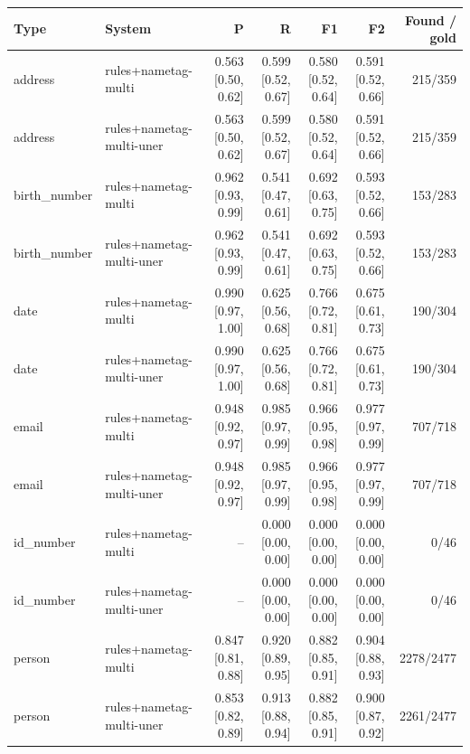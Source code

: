 \providecommand{\ci}[2]{{\scriptsize [#1, #2]}}

\begin{table}[htbp]
\centering
\small
\begin{tabular}{llrrrrr}
\toprule
Type & System & P & R & F1 & F2 & Found / gold \\
\midrule
address & rules+nametag-multi & 0.563 \ci{0.50}{0.62} & 0.599 \ci{0.52}{0.67} & 0.580 \ci{0.52}{0.64} & 0.591 \ci{0.52}{0.66} & 215/359 \\
address & rules+nametag-multi-uner & 0.563 \ci{0.50}{0.62} & 0.599 \ci{0.52}{0.67} & 0.580 \ci{0.52}{0.64} & 0.591 \ci{0.52}{0.66} & 215/359 \\
birth\_number & rules+nametag-multi & 0.962 \ci{0.93}{0.99} & 0.541 \ci{0.47}{0.61} & 0.692 \ci{0.63}{0.75} & 0.593 \ci{0.52}{0.66} & 153/283 \\
birth\_number & rules+nametag-multi-uner & 0.962 \ci{0.93}{0.99} & 0.541 \ci{0.47}{0.61} & 0.692 \ci{0.63}{0.75} & 0.593 \ci{0.52}{0.66} & 153/283 \\
date & rules+nametag-multi & 0.990 \ci{0.97}{1.00} & 0.625 \ci{0.56}{0.68} & 0.766 \ci{0.72}{0.81} & 0.675 \ci{0.61}{0.73} & 190/304 \\
date & rules+nametag-multi-uner & 0.990 \ci{0.97}{1.00} & 0.625 \ci{0.56}{0.68} & 0.766 \ci{0.72}{0.81} & 0.675 \ci{0.61}{0.73} & 190/304 \\
email & rules+nametag-multi & 0.948 \ci{0.92}{0.97} & 0.985 \ci{0.97}{0.99} & 0.966 \ci{0.95}{0.98} & 0.977 \ci{0.97}{0.99} & 707/718 \\
email & rules+nametag-multi-uner & 0.948 \ci{0.92}{0.97} & 0.985 \ci{0.97}{0.99} & 0.966 \ci{0.95}{0.98} & 0.977 \ci{0.97}{0.99} & 707/718 \\
id\_number & rules+nametag-multi & -- & 0.000 \ci{0.00}{0.00} & 0.000 \ci{0.00}{0.00} & 0.000 \ci{0.00}{0.00} & 0/46 \\
id\_number & rules+nametag-multi-uner & -- & 0.000 \ci{0.00}{0.00} & 0.000 \ci{0.00}{0.00} & 0.000 \ci{0.00}{0.00} & 0/46 \\
person & rules+nametag-multi & 0.847 \ci{0.81}{0.88} & 0.920 \ci{0.89}{0.95} & 0.882 \ci{0.85}{0.91} & 0.904 \ci{0.88}{0.93} & 2278/2477 \\
person & rules+nametag-multi-uner & 0.853 \ci{0.82}{0.89} & 0.913 \ci{0.88}{0.94} & 0.882 \ci{0.85}{0.91} & 0.900 \ci{0.87}{0.92} & 2261/2477 \\

\end{tabular}
\end{table}
